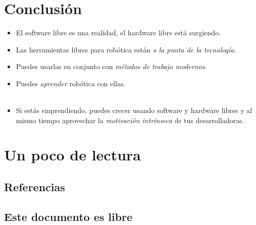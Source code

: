 \section*{Conclusión}
  
  \begin{frame}{\insertsection}
    \begin{itemize}
      \item El software libre es una realidad, el \alert{hardware} libre está surgiendo.
      \item Las herramientas libres para robótica están \emph{a la punta de la tecnología}.
      \item Puedes usarlas en conjunto con \emph{métodos de trabajo modernos}.
      \item Puedes \emph{aprender} robótica con ellas.\\~\\
      \item Si estás emprendiendo, puedes crecer usando software y hardware libres y al mismo tiempo aprovechar la \emph{motivación intrínseca} de tus desarrolladoras.
    \end{itemize}
  \end{frame}

\appendix

\section{Un poco de lectura}

%
\subsection{Referencias}

  \begin{frame}{\insertsubsection}
    {}
    
    \nocite{pilgrim2004dive}
  \end{frame}

%
\subsection{Este documento es libre}


